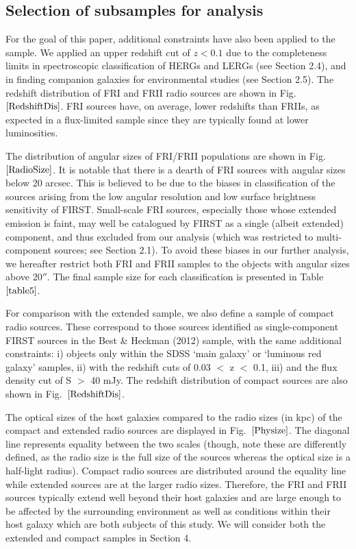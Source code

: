 \documentclass[usenatbib]{mn2e}
\begin{document}
\subsection {Selection of subsamples for analysis} 

For the goal of this paper, additional constraints have also been applied to the sample.
We applied an upper redshift cut of $z<0.1$ due to the
completeness limits in spectroscopic classification of
HERGs and LERGs (see Section 2.4), and in finding companion galaxies for environmental
studies (see Section 2.5). The redshift distribution of FRI and FRII radio sources are shown in
 Fig.~$\ref{RedshiftDis}$.  FRI sources have, on average, lower redshifts than FRIIs, as
expected in a flux-limited sample since they are typically found at lower
luminosities. 

The distribution of angular sizes of FRI/FRII populations are shown in 
Fig.~$\ref{RadioSize}$.  It is notable that there is a dearth of FRI sources with angular sizes below 20 arcsec.
This is believed to be due to the biases in classification of the sources arising from the 
low angular resolution and low surface brightness sensitivity of FIRST. Small-scale FRI sources, 
especially those whose extended emission is faint, may well be catalogued by FIRST as a 
single (albeit extended) component, and thus excluded from our analysis (which was restricted 
to multi-component sources; see Section 2.1).
To avoid these biases in our further analysis, we hereafter
restrict both FRI and FRII samples to the objects with angular sizes above
20$''$. The final sample size for each classification is presented in
Table~$\ref{table5}$.

For comparison with the extended sample, we also define a sample of compact radio sources.
 These correspond to those sources identified as single-component FIRST sources in the Best
\& Heckman (2012) sample, with the same additional constraints: i) objects only within 
the SDSS `main galaxy' or `luminous red galaxy' samples, 
ii) with the redshift cuts of 0.03 $<$ z $<$ 0.1, iii) and the flux density cut of S $>$ 40 mJy. The redshift distribution 
of compact sources are also shown in Fig.~$\ref{RedshiftDis}$.

The optical sizes of the host galaxies compared to the radio sizes (in kpc) of the compact 
and extended radio sources are displayed in Fig.~$\ref{Physize}$. 
The diagonal line represents equality between the two scales (though, note these are 
differently defined, as the radio size is the full size of the sources whereas the 
optical size is a half-light radius). Compact radio sources
are distributed around the equality line while extended sources are at the larger radio sizes.
Therefore, the FRI and FRII sources typically extend well beyond their host galaxies and
are large enough to be affected by the surrounding environment as well as conditions within 
their host galaxy which are both subjects of this study. 
 We will consider both the extended and compact samples in Section 4.    
\end{document}
